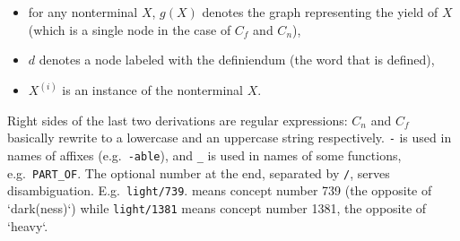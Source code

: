 \documentclass[a4paper,10pt]{article}
\begin{document}
\begin{itemize}
 \item for any nonterminal $X$, $g(X)$ denotes the graph representing the yield of $X$ (which is a single node in the case of $C_f$ and $C_n$),
 \item $d$ denotes a node labeled with the definiendum (the word that is defined),
 \item $X^{(i)}$ is an instance of the nonterminal $X$.
\end{itemize}
Right sides of the last two derivations are regular expressions: $C_n$ and $C_f$ basically rewrite to a lowercase and an uppercase string respectively. \texttt{-} is used in names of affixes (e.g.\ \texttt{-able}), and \texttt{\_} is used in names of some functions, e.g.\ \texttt{PART\_OF}. The optional number at the end, separated by \texttt{/}, serves disambiguation. E.g.\ \texttt{light/739}.
means concept number 739 (the opposite of `dark(ness)`) while \texttt{light/1381} means concept number 1381, the opposite of `heavy`.
\end{document}
